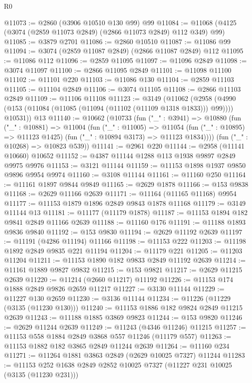 \begin{lexlean}{R0}
\begin{coremodule}
@11073 := @2860 (@3906 @10510 @130 @99) @99
@11084 := @11068 (@4125 (@3074 (@2859 @11073 @2849) (@2866 @11073 @2849) @112 @349) @99)
@11085 := @3879 @2701
@11086 := @2860 @10510
@11087 := @11086 @99
@11094 := @3074 (@2859 @11087 @2849) (@2866 @11087 @2849) @112
@11095 := @11086 @112
@11096 := @2859 @11095
@11097 := @11096 @2849
@11098 := @3074 @11097
@11100 := @2866 @11095 @2849
@11101 := @11098 @11100
@11102 := @11101 @220
@11103 := @11086 @130
@11104 := @2859 @11103
@11105 := @11104 @2849
@11106 := @3074 @11105
@11108 := @2866 @11103 @2849
@11109 := @11106 @11108
@11123 := @3149
    (@11062
      (@2958 (@4990 (@153 (@11084 (@11085 (@11094 (@11102 (@11109 @1318 @1833))) @99)))) @10531))
    @13
@11140 := @10662
    (@10733
      (fun ("_" : @3941) =>
      @10880
        (fun ("_" : @10881) =>
        @11004
          (fun ("_" : @11005) =>
          @11054 (fun ("_" : @10895) => @11123 @1425) (fun ("_" : @10894 @3173) => @11123 @1834))))
      (fun ("_" : @10268) => @10823 @539))
@11141 := @2961 @220
@11144 := @2958 (@11141 @10660) @10652
@11152 := @4387 @11144 @1288 @113 @1938 @9897 @2849 @9975 @9976
@11153 := @3121 @11144
@11159 := @11153 @1898 @1937 @9850 @9896 @9954 @9974
@11160 := @3108 @11144
@11161 := @11160 @250
@11164 := @11161 @1897 @9844 @9849
@11165 := @2629 @1878
@11166 := @153 @9838
@11168 := @2629 @11166 @2639
@11171 := @11164 (@11165 @11168) @9954
@11177 := @11153 @1879 @1896 @2849 @9843 @1878 @11168
@11179 := @3149 @11144 @13
@11181 := @11177 (@11179 @1878)
@11187 := @11153 @1894 @182 @9841 @2849 @11166 @2639
@11188 := @11160 @176
@11191 := @11188 @1893 @9836 @9840
@11192 := @153 @9830
@11194 := @2629 @11192 @2639
@11197 := @11191 (@4286 @11194) @11166
@11198 := @11153 @222
@11203 := @11198 @1892 @2849 @9835 @221 @11194
@11204 := @11179 @221
@11205 := @11203 @11204
@11211 := @11153 @1890 @182 @9833 @2849 @11192 @2639
@11214 := @11161 @1889 @9827 @9832
@11215 := @153 @9821
@11217 := @2629 @11215 @2639
@11220 := @11214 (@2660 @11217) @11192
@11226 := @11153 @174 @1888 @2849 @9826 @2659 @11217
@11227 := @3130 @11144
@11229 := @11227 @130 @2659
@11230 := @3136 @11144
@11234 := @11226 (@11229 (@3135 (@11230 @130)))
@11240 := @11153 @1886 @182 @9824 @2849 @11215 @2639
@11243 := @11188 @1885 @3869 @9823
@11244 := @153 @9820
@11246 := @2629 @11244 @2639
@11249 := @11243 (@4346 @11246) @11215
@11257 := @11153 @558 @1884 @2849 @3868 @557 @11246 (@11179 @557)
@11263 := @11153 @1882 @182 @3865 @2849 @11244 @2639
@11264 := @11160 @234
@11271 := @11264 @1881 @3863 @2849 (@2629 @10025 @7327) @11244
@11283 := @11153 @252 @1638 @2849 @2852 @10025 @7327 (@11227 @231 @10025 (@3135 (@11230 @231)))

\end{coremodule}
\end{lexlean}
